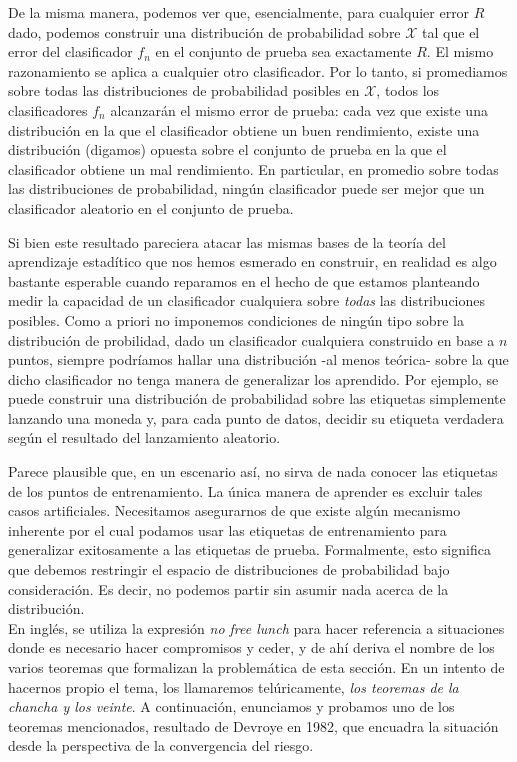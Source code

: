 \documentclass{report}
\begin{document}
De la misma manera, podemos ver que, esencialmente, para cualquier error \(R\) dado, podemos
construir una distribución de probabilidad sobre \(\mathcal{X}\) tal que el error del clasificador \(f_n\) en el
conjunto de prueba sea exactamente \(R\). El mismo razonamiento se aplica a cualquier otro
clasificador. Por lo tanto, si promediamos sobre todas las distribuciones de probabilidad posibles en \(\mathcal{X}\),
todos los clasificadores \(f_n\) alcanzarán el mismo error de prueba: cada vez que existe una
distribución en la que el clasificador obtiene un buen rendimiento, existe una distribución
(digamos) opuesta sobre el conjunto de prueba en la que el clasificador obtiene un mal rendimiento.
En particular, en promedio sobre todas las distribuciones de probabilidad, ningún
clasificador puede ser mejor que un clasificador aleatorio en el conjunto de prueba.

Si bien este resultado pareciera atacar las mismas bases de la teoría del aprendizaje estadítico que nos hemos esmerado en
construir, en realidad es algo bastante esperable cuando reparamos en el hecho de que estamos planteando
medir la capacidad de un clasificador cualquiera sobre \textit{todas} las distribuciones posibles. Como a priori
no imponemos condiciones de ningún tipo sobre la distribución de probilidad, dado un clasificador cualquiera construido
en base a $n$ puntos, siempre podríamos hallar una distribución -al menos teórica- sobre la que dicho clasificador no tenga
manera de generalizar los aprendido. Por ejemplo, se puede construir una distribución de probabilidad sobre las etiquetas simplemente
lanzando una moneda y, para cada punto de datos, decidir su etiqueta verdadera según el resultado del
lanzamiento aleatorio.

Parece plausible que, en un escenario así, no sirva de nada conocer las etiquetas de los puntos de
entrenamiento. La única manera de aprender es excluir tales casos artificiales. Necesitamos asegurarnos
de que existe algún mecanismo inherente por el cual podamos usar las etiquetas de entrenamiento para
generalizar exitosamente a las etiquetas de prueba. Formalmente, esto significa que debemos restringir
el espacio de distribuciones de probabilidad bajo consideración. Es decir, no podemos partir sin asumir
nada acerca de la distribución.\\

En inglés, se utiliza la expresión \textit{no free lunch} para hacer referencia
a situaciones donde es necesario hacer compromisos y ceder, y de ahí deriva el nombre de los varios teoremas
que formalizan la problemática de esta sección. En un intento de hacernos propio el tema, los llamaremos
telúricamente, \textit{los teoremas de la chancha y los veinte}.
A continuación, enunciamos y probamos uno de los teoremas mencionados, resultado de Devroye en 1982, que encuadra la
situación desde la perspectiva de la convergencia del riesgo.
\end{document}
